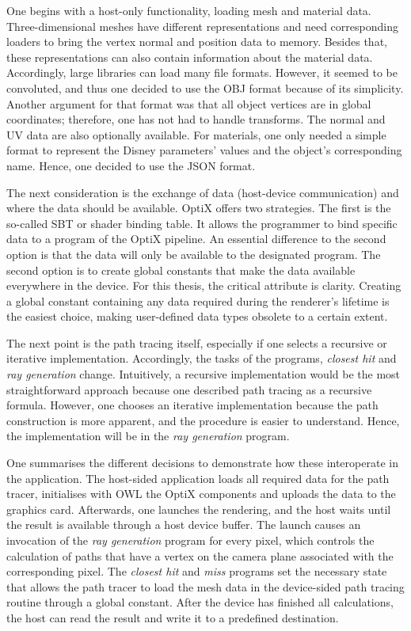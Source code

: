 One begins with a host-only functionality, loading mesh and material data.
Three-dimensional meshes have different representations and need corresponding loaders to bring the vertex normal and position data to memory.
Besides that, these representations can also contain information about the material data.
Accordingly, large libraries can load many file formats.
However, it seemed to be convoluted, and thus one decided to use the OBJ format because of its simplicity.
Another argument for that format was that all object vertices are in global coordinates; therefore, one has not had to handle transforms.
The normal and UV data are also optionally available.
For materials, one only needed a simple format to represent the Disney parameters' values and the object's corresponding name.
Hence, one decided to use the JSON format.

The next consideration is the exchange of data (host-device communication) and where the data should be available.
OptiX offers two strategies.
The first is the so-called SBT or shader binding table.
It allows the programmer to bind specific data to a program of the OptiX pipeline.
An essential difference to the second option is that the data will only be available to the designated program.
The second option is to create global constants that make the data available everywhere in the device.
For this thesis, the critical attribute is clarity.
Creating a global constant containing any data required during the renderer's lifetime is the easiest choice, making user-defined data types obsolete to a certain extent.

The next point is the path tracing itself, especially if one selects a recursive or iterative implementation.
Accordingly, the tasks of the programs, \textit{closest hit} and \textit{ray generation} change.
Intuitively, a recursive implementation would be the most straightforward approach because one described path tracing as a recursive formula.
However, one chooses an iterative implementation because the path construction is more apparent, and the procedure is easier to understand.
Hence, the implementation will be in the \textit{ray generation} program.

One summarises the different decisions to demonstrate how these interoperate in the application.
The host-sided application loads all required data for the path tracer, initialises with OWL the OptiX components and uploads the data to the graphics card.
Afterwards, one launches the rendering, and the host waits until the result is available through a host device buffer.
The launch causes an invocation of the \textit{ray generation} program for every pixel, which controls the calculation of paths that have a vertex on the camera plane associated with the corresponding pixel.
The \textit{closest hit} and \textit{miss} programs set the necessary state that allows the path tracer to load the mesh data in the device-sided path tracing routine through a global constant.
After the device has finished all calculations, the host can read the result and write it to a predefined destination.

